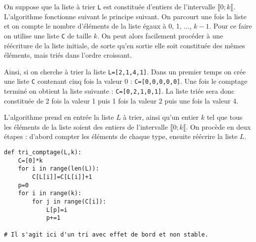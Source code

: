 
On suppose que la liste à trier \texttt{L} est constituée d’entiers de l’intervalle  $\llbracket 0; k \llbracket$. L’algorithme
fonctionne suivant le principe suivant. On parcourt une fois la liste et on compte le nombre d’éléments de
la liste égaux à 0, 1, ..., $k-1$. Pour ce faire on utilise une liste \texttt{C} de taille $k$. On peut alors facilement procéder à une
réécriture de la liste initiale, de sorte qu’en sortie elle soit constituée des mêmes éléments, mais triés dans l’ordre
croissant.

Ainsi, si on cherche à trier la liste \texttt{L=[2,1,4,1]}. Dans un premier temps on crée une liste \texttt{C} contenant cinq fois la valeur 0 : \texttt{C=[0,0,0,0,0]}. Une fois le comptage terminé on obtient la liste suivante : \texttt{C=[0,2,1,0,1]}. La liste triée sera donc constituée de 2 fois la valeur 1 puis 1 fois la valeur 2 puis une fois la valeur 4.



L’algorithme prend en entrée la liste $L$ à trier, ainsi qu’un entier $k$ tel que tous les éléments de la
liste soient des entiers de l’intervalle $\llbracket 0; k \llbracket$. On procède en deux étapes : d’abord compter les éléments de chaque type,
ensuite réécrire la liste $L$.




\ifprof
\begin{lstlisting}
def tri_comptage(L,k):
    C=[0]*k
    for i in range(len(L)):
        C[L[i]]=C[L[i]]+1
    p=0
    for i in range(k):
        for j in range(C[i]):
            L[p]=i
            p+=1
            
# Il s'agit ici d'un tri avec effet de bord et non stable. 
\end{lstlisting}
\else
\fi